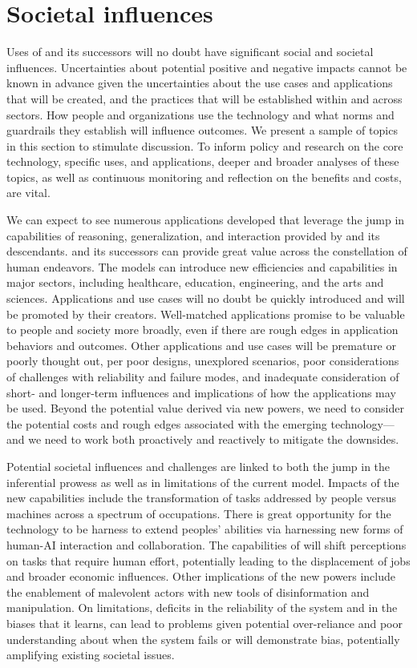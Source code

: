 \section{Societal influences}
\label{sec:societal}


Uses of {\DV} and its successors will no doubt have significant social and societal influences. Uncertainties about potential positive and negative impacts cannot be known in advance given the uncertainties about the use cases and applications that will be created, and the practices that will be established within and across sectors. How people and organizations use the technology and what norms and guardrails they establish will influence outcomes. We present a sample of topics in this section to stimulate discussion. To inform policy and research on the core technology, specific uses, and applications, deeper and broader analyses of these topics, as well as continuous monitoring and reflection on the benefits and costs, are vital.

We can expect to see numerous applications developed that leverage the jump in capabilities of reasoning, generalization, and interaction provided by {\DV} and its descendants. {\DV} and its successors can provide great value across the constellation of human endeavors. The models can introduce new efficiencies and capabilities in major sectors, including healthcare, education, engineering, and the arts and sciences. Applications and use cases will no doubt be quickly introduced and will be promoted by their creators. Well-matched applications promise to be valuable to people and society more broadly, even if there are rough edges in application behaviors and outcomes. Other applications and use cases will be premature or poorly thought out, per poor designs, unexplored scenarios, poor considerations of challenges with reliability and failure modes, and inadequate consideration of short- and longer-term influences and implications of how the applications may be used. Beyond the potential value derived via new powers, we need to consider the potential costs and rough edges associated with the emerging technology---and we need to work both proactively and reactively to mitigate the downsides.
 
Potential societal influences and challenges are linked to both the jump in the inferential prowess as well as in limitations of the current model.  Impacts of the new capabilities include the transformation of  tasks addressed by people versus machines across a spectrum of occupations. There is great opportunity for the technology to be harness to extend peoples' abilities via harnessing new forms of human-AI interaction and collaboration. The capabilities of {\DV} will shift perceptions on tasks that require human effort, potentially leading to the displacement of jobs and broader economic influences. Other implications of the new powers include the enablement of malevolent actors with new tools of disinformation and manipulation.  On limitations, deficits in the reliability of the system and in the biases that it learns, can lead to problems given potential over-reliance and poor understanding about when the system fails or will demonstrate bias, potentially amplifying existing societal issues.

